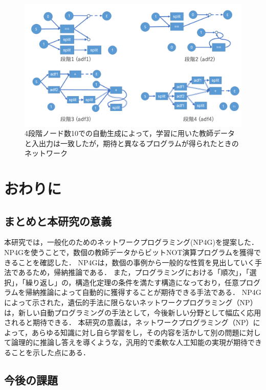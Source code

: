 \documentclass[exploratorypaper]{jsaiart} %
\begin{document}
\begin{figure}[t]
    \begin{center}
        \includegraphics[width=150mm]{out_net_p4n10.png}
    \end{center}
    \capwidth=90mm %
    \caption{4段階ノード数10での自動生成によって，学習に用いた教師データと入出力は一致したが，期待と異なるプログラムが得られたときのネットワーク}
    \label{fig:out_net_p4n10}
\end{figure}

\section{おわりに}
\subsection{まとめと本研究の意義}
本研究では，一般化のためのネットワークプログラミング(NP4G)を提案した．NP4Gを使うことで，数個の教師データからビットNOT演算プログラムを獲得できることを確認した．
NP4Gは，数個の事例から一般的な性質を見出していく手法であるため，帰納推論である．
また，プログラミングにおける「順次」，「選択」，「繰り返し」の，構造化定理の条件を満たす構造になっており，任意プログラムを帰納推論によって自動的に獲得することが期待できる手法である．
NP4Gによって示された，遺伝的手法に限らないネットワークプログラミング（NP）は，新しい自動プログラミングの手法として，今後新しい分野として幅広く応用されると期待できる．
本研究の意義は，ネットワークプログラミング（NP）によって，あらゆる知識に対し自ら学習をし，その内容を活かして別の問題に対して論理的に推論し答えを導くような，汎用的で柔軟な人工知能の実現が期待できることを示した点にある．
\subsection{今後の課題}
\end{document}
